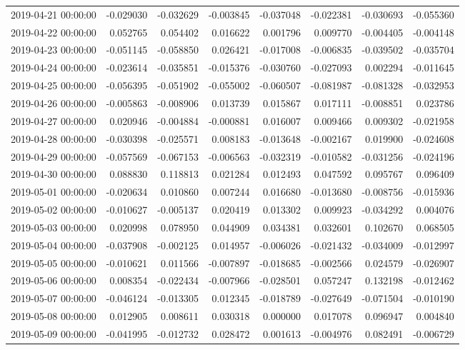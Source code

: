\begin{tabular}{lrrrrrrr}
2019-04-21 00:00:00 & -0.029030 & -0.032629 & -0.003845 & -0.037048 & -0.022381 & -0.030693 & -0.055360 \\
2019-04-22 00:00:00 & 0.052765 & 0.054402 & 0.016622 & 0.001796 & 0.009770 & -0.004405 & -0.004148 \\
2019-04-23 00:00:00 & -0.051145 & -0.058850 & 0.026421 & -0.017008 & -0.006835 & -0.039502 & -0.035704 \\
2019-04-24 00:00:00 & -0.023614 & -0.035851 & -0.015376 & -0.030760 & -0.027093 & 0.002294 & -0.011645 \\
2019-04-25 00:00:00 & -0.056395 & -0.051902 & -0.055002 & -0.060507 & -0.081987 & -0.081328 & -0.032953 \\
2019-04-26 00:00:00 & -0.005863 & -0.008906 & 0.013739 & 0.015867 & 0.017111 & -0.008851 & 0.023786 \\
2019-04-27 00:00:00 & 0.020946 & -0.004884 & -0.000881 & 0.016007 & 0.009466 & 0.009302 & -0.021958 \\
2019-04-28 00:00:00 & -0.030398 & -0.025571 & 0.008183 & -0.013648 & -0.002167 & 0.019900 & -0.024608 \\
2019-04-29 00:00:00 & -0.057569 & -0.067153 & -0.006563 & -0.032319 & -0.010582 & -0.031256 & -0.024196 \\
2019-04-30 00:00:00 & 0.088830 & 0.118813 & 0.021284 & 0.012493 & 0.047592 & 0.095767 & 0.096409 \\
2019-05-01 00:00:00 & -0.020634 & 0.010860 & 0.007244 & 0.016680 & -0.013680 & -0.008756 & -0.015936 \\
2019-05-02 00:00:00 & -0.010627 & -0.005137 & 0.020419 & 0.013302 & 0.009923 & -0.034292 & 0.004076 \\
2019-05-03 00:00:00 & 0.020998 & 0.078950 & 0.044909 & 0.034381 & 0.032601 & 0.102670 & 0.068505 \\
2019-05-04 00:00:00 & -0.037908 & -0.002125 & 0.014957 & -0.006026 & -0.021432 & -0.034009 & -0.012997 \\
2019-05-05 00:00:00 & -0.010621 & 0.011566 & -0.007897 & -0.018685 & -0.002566 & 0.024579 & -0.026907 \\
2019-05-06 00:00:00 & 0.008354 & -0.022434 & -0.007966 & -0.028501 & 0.057247 & 0.132198 & -0.012462 \\
2019-05-07 00:00:00 & -0.046124 & -0.013305 & 0.012345 & -0.018789 & -0.027649 & -0.071504 & -0.010190 \\
2019-05-08 00:00:00 & 0.012905 & 0.008611 & 0.030318 & 0.000000 & 0.017078 & 0.096947 & 0.004840 \\
2019-05-09 00:00:00 & -0.041995 & -0.012732 & 0.028472 & 0.001613 & -0.004976 & 0.082491 & -0.006729 \\

\end{tabular}
